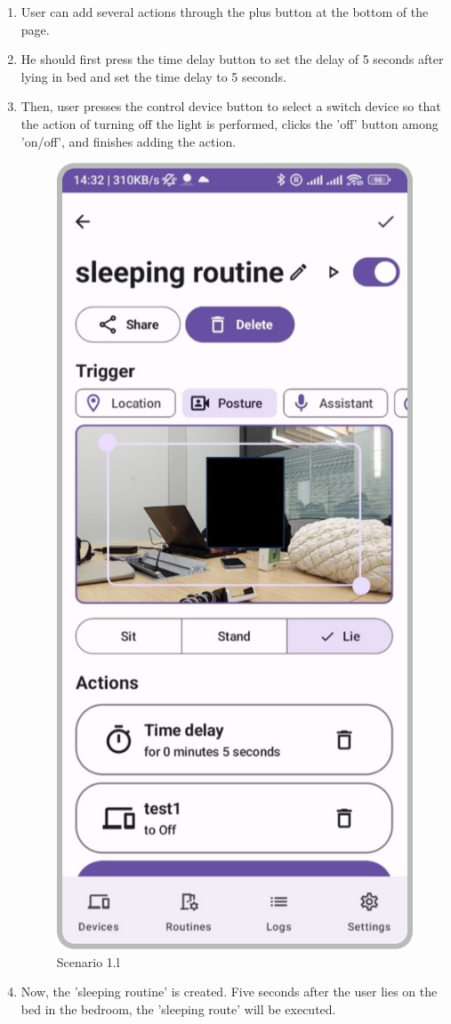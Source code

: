 \begin{enumerate}
\begin{enumerate}
        \item User can add several actions through the plus button at the bottom of the page. \\
        \item He should first press the time delay button to set the delay of 5 seconds after lying in bed and set the time delay to 5 seconds. \\
        \item Then, user presses the control device button to select a switch device so that the action of turning off the light is performed, clicks the 'off' button among 'on/off', and finishes adding the action.\\
        \begin{figure}
            \centering
            \includegraphics[width=0.5\linewidth]{imgs/usercase/usercase_scenario1_12.png}
            \caption{Scenario 1.l}
            \label{fig:enter-label}
        \end{figure}
        \item Now, the 'sleeping routine' is created. Five seconds after the user lies on the bed in the bedroom, the 'sleeping route' will be executed.\\
        \begin{figure}

\end{figure}
\end{enumerate}
\end{enumerate}
